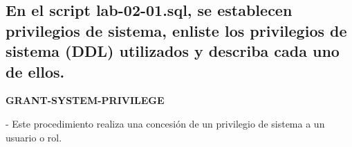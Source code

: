 \documentclass[12pt,letterpaper]{article}
\begin{document}
\subsection{En el script lab-02-01.sql, se establecen privilegios de sistema, enliste los privilegios de sistema (DDL) utilizados y describa cada uno de ellos.} 


\textbf{GRANT-SYSTEM-PRIVILEGE} \ 
\begin{itemize}
- Este procedimiento realiza una concesión de un privilegio de sistema a un usuario o rol.
\end{itemize}
\end{document}
